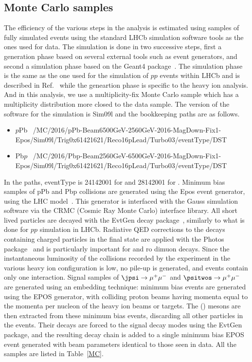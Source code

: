 \subsection{Monte Carlo samples}
The efficiency of the various steps in the analysis is estimated using samples of fully simulated events using the standard LHCb simulation software tools as the ones used for data. The simulation is done in two successive steps, first a generation phase based on several external tools such as event generators, and second a simulation phase based on the Geant4 package~\cite{AGOSTINELLI2003250,1610988}. The simulation phase is the same as the one used for the simulation of $pp$ events within LHCb and is described in Ref.~\cite{LHCb:2011dpk} while the geneartion phase is specific to the heavy ion analysis. And in this analysis, we use a multiplicity-fix Monte Carlo sample which has a multiplicity distribution more closed to the data sample. The version of the software for the simulation is Sim09l and the bookkeeping paths are as follows.
\begin{itemize}
\item $p$Pb \ /MC/2016/pPb-Beam6500GeV-2560GeV-2016-MagDown-Fix1-Epos/Sim09l/Trig0x61421621/Reco16pLead/Turbo03/eventType/DST
\item Pb$p$ \ /MC/2016/Pbp-Beam2560GeV-6500GeV-2016-MagDown-Fix1-Epos/Sim09l/Trig0x61421621/Reco16pLead/Turbo03/eventType/DST
\end{itemize}
In the paths, eventType is 24142001 for \jpsi and 28142001 for \psitwos. Minimum bias samples of pPb and Pbp collisions are generated using the Epos event generator, using the LHC model~\cite{Pierog:2013ria}. This generator is interfaced with the Gauss simulation software via the CRMC (Cosmic Ray Monte Carlo) interface library. All short lived particles are decayed with the EvtGen decay package~\cite{LANGE2001152}, similarly to what is done for $pp$ simulation in LHCb. Radiative QED corrections to the decays containing charged particles in the final state are applied with the Photos package~\cite{Golonka:2005pn} and is particularly important for \jpsi and \psitwos ro dimuon decays. Since the instantaneous luminosity of the collisions recorded by the experiment in the various heavy ion configuration is low, no pile-up is generated, and events contain only one interaction.
Signal samples of $\jpsi  \rightarrow \mu^+ \mu^-$ and $\psitwos \rightarrow \mu^+ \mu^-$ are generated using an embedding technique: minimum bias events are generated using the EPOS generator, with colliding proton beams having momenta equal to the momenta per nucleon of the heavy ion beams or targets. The \jpsi(\psitwos) mesons are then extracted from these minimum bias events, discarding all other particles in the events. Their decays are forced to the signal decay modes using the EvtGen package, and the resulting decay chain is added to a single minimum bias EPOS event generated with beam parameters identical to those seen in data. All the samples are listed in Table~\ref{MC}.
